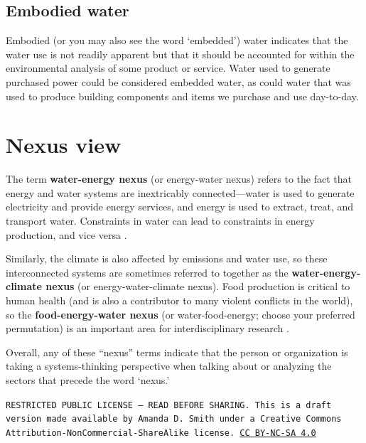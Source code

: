 \documentclass[10pt]{article}
\begin{document}
\subsection{Embodied water}

Embodied (or you may also see the word `embedded') water indicates that the water use is not readily apparent but that it should be accounted for within the environmental analysis of some product or service. Water used to generate purchased power could be considered embedded water, as could water that was used to produce building components and items we purchase and use day-to-day.

\section{Nexus view}

The term \textbf{water-energy nexus} (or energy-water nexus) refers to the fact that energy and water systems are inextricably connected---water is used to generate electricity and provide energy services, and energy is used to extract, treat, and transport water. Constraints in water can lead to constraints in energy production, and vice versa \cite{waterenergynexus}.

Similarly, the climate is also affected by emissions and water use, so these interconnected systems are sometimes referred to together as the \textbf{water-energy-climate nexus} (or energy-water-climate nexus). Food production is critical to human health (and is also a contributor to many violent conflicts in the world), so the \textbf{food-energy-water nexus} (or water-food-energy; choose your preferred permutation) is an important area for interdisciplinary research \cite{Cai2018-zk}.


Overall, any of these ``nexus'' terms indicate that the person or organization is taking a systems-thinking perspective when talking about or analyzing the sectors that precede the word `nexus.'

\bigskip

\noindent
\texttt{\footnotesize RESTRICTED PUBLIC LICENSE --- READ BEFORE SHARING. This is a draft version made available by Amanda D. Smith under a Creative Commons Attribution-NonCommercial-ShareAlike license. 
\href{https://creativecommons.org/licenses/by-nc-sa/4.0/}{CC BY-NC-SA 4.0}}


\printbibliography
\end{document}
